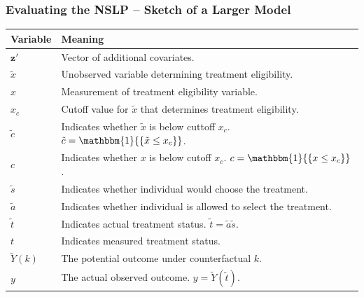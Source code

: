 \documentclass[xcolor=dvipsnames]{beamer}
\newcommand{\indicator}[1]{\mathbbm{1}{\left\{ {#1} \right\} }}
\begin{document}
\begin{frame}
\frametitle{Evaluating the NSLP -- Sketch of a Larger Model}

\begin{table}[!ht]
\centering
\begin{tabular}{|l|l|}
\hline
Variable & Meaning \\
\hline\hline
$\bm{z}'$ & Vector of additional covariates.\\
$\tilde{x}$ & Unobserved variable determining treatment eligibility.\\
$x$ & Measurement of treatment eligibility variable.\\
$x_c$ & Cutoff value for $\tilde{x}$ that determines treatment
eligibility.\\
$\tilde{c}$ & Indicates whether $\tilde{x}$ is below cuttoff
$x_c$. $\tilde{c}=\indicator{\tilde{x}\leq x_c}$.\\
$c$ & Indicates whether $x$ is below cutoff $x_c$. $c=\indicator{x\leq x_c}$.\\
$\tilde{s}$ & Indicates whether individual would choose the treatment.\\
$\tilde{a}$ & Indicates whether individual is allowed to select the
treatment.\\
$\tilde{t}$ & Indicates actual treatment status. $\tilde{t}=\tilde{a}\tilde{s}$.\\
$t$ & Indicates measured treatment status.\\ 
$\tilde{Y}(k)$ & The potential outcome under counterfactual $k$.\\
$y$ & The actual observed outcome. $y=\tilde{Y}(\tilde{t})$.\\
\hline
\end{tabular}
\end{table}

\end{frame}
\end{document}
